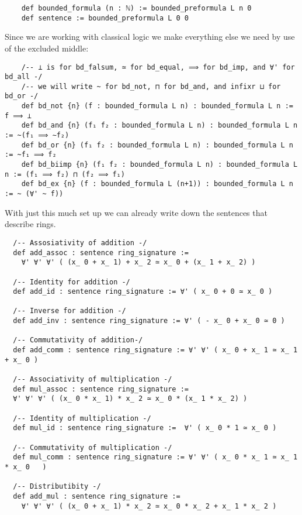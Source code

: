 \begin{dfn}[Formulas]
\begin{lstlisting}
    def bounded_formula (n : ℕ) := bounded_preformula L n 0
    def sentence := bounded_preformula L 0 0\end{lstlisting}

  Since we are working with classical logic we
  make everything else we need by use of the excluded middle:

  \begin{lstlisting}
    /-- ⊥ is for bd_falsum, ≃ for bd_equal, ⟹ for bd_imp, and ∀' for bd_all -/
    /-- we will write ~ for bd_not, ⊓ for bd_and, and infixr ⊔ for bd_or -/
    def bd_not {n} (f : bounded_formula L n) : bounded_formula L n := f ⟹ ⊥
    def bd_and {n} (f₁ f₂ : bounded_formula L n) : bounded_formula L n := ~(f₁ ⟹ ∼f₂)
    def bd_or {n} (f₁ f₂ : bounded_formula L n) : bounded_formula L n := ~f₁ ⟹ f₂
    def bd_biimp {n} (f₁ f₂ : bounded_formula L n) : bounded_formula L n := (f₁ ⟹ f₂) ⊓ (f₂ ⟹ f₁)
    def bd_ex {n} (f : bounded_formula L (n+1)) : bounded_formula L n := ~ (∀' ~ f))
  \end{lstlisting}
\end{dfn}

With just this much set up
we can already write down the sentences that describe rings.

\begin{lstlisting}
  /-- Assosiativity of addition -/
  def add_assoc : sentence ring_signature :=
    ∀' ∀' ∀' ( (x_ 0 + x_ 1) + x_ 2 ≃ x_ 0 + (x_ 1 + x_ 2) )

  /-- Identity for addition -/
  def add_id : sentence ring_signature := ∀' ( x_ 0 + 0 ≃ x_ 0 )

  /-- Inverse for addition -/
  def add_inv : sentence ring_signature := ∀' ( - x_ 0 + x_ 0 ≃ 0 )

  /-- Commutativity of addition-/
  def add_comm : sentence ring_signature := ∀' ∀' ( x_ 0 + x_ 1 ≃ x_ 1 + x_ 0 )

  /-- Associativity of multiplication -/
  def mul_assoc : sentence ring_signature :=
  ∀' ∀' ∀' ( (x_ 0 * x_ 1) * x_ 2 ≃ x_ 0 * (x_ 1 * x_ 2) )

  /-- Identity of multiplication -/
  def mul_id : sentence ring_signature :=  ∀' ( x_ 0 * 1 ≃ x_ 0 )

  /-- Commutativity of multiplication -/
  def mul_comm : sentence ring_signature := ∀' ∀' ( x_ 0 * x_ 1 ≃ x_ 1 * x_ 0   )

  /-- Distributibity -/
  def add_mul : sentence ring_signature :=
    ∀' ∀' ∀' ( (x_ 0 + x_ 1) * x_ 2 ≃ x_ 0 * x_ 2 + x_ 1 * x_ 2 )
\end{lstlisting}

